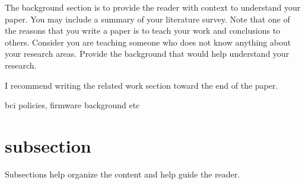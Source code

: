 The background section is to provide the reader with context to understand your paper. You may include a summary of your literature survey. Note that one of the reasons that you write a paper is to teach your work and conclusions to others.  Consider you are teaching someone who does not know anything about your research areas. Provide the background that would help understand your research. 

I recommend writing the related work section toward the end of the paper. 

bci policies, firmware background etc

\section{subsection}
Subsections help organize the content and help guide the reader. 
